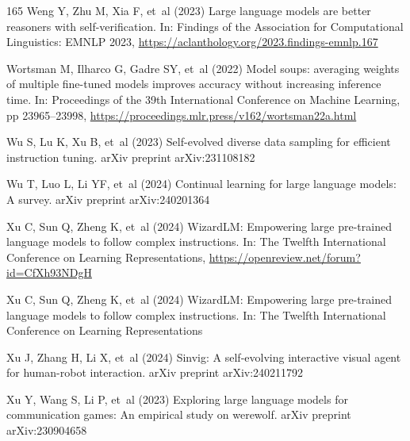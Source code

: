 \documentclass[sn-basic, Numbered]{sn-jnl}%
\theoremstyle{thmstyleone}%
\theoremstyle{thmstyletwo}%
\theoremstyle{thmstylethree}%
\begin{document}
\begin{thebibliography}{165}
Weng Y, Zhu M, Xia F, et~al (2023) Large language models are better reasoners with self-verification. In: Findings of the Association for Computational Linguistics: EMNLP 2023, \urlprefix\url{https://aclanthology.org/2023.findings-emnlp.167}

Wortsman M, Ilharco G, Gadre SY, et~al (2022) Model soups: averaging weights of multiple fine-tuned models improves accuracy without increasing inference time. In: Proceedings of the 39th International Conference on Machine Learning, pp 23965--23998, \urlprefix\url{https://proceedings.mlr.press/v162/wortsman22a.html}

Wu S, Lu K, Xu B, et~al (2023) Self-evolved diverse data sampling for efficient instruction tuning. arXiv preprint arXiv:231108182

Wu T, Luo L, Li YF, et~al (2024) Continual learning for large language models: A survey. arXiv preprint arXiv:240201364

Xu C, Sun Q, Zheng K, et~al (2024{}) Wizard{LM}: Empowering large pre-trained language models to follow complex instructions. In: The Twelfth International Conference on Learning Representations, \urlprefix\url{https://openreview.net/forum?id=CfXh93NDgH}

Xu C, Sun Q, Zheng K, et~al (2024{}) Wizard{LM}: Empowering large pre-trained language models to follow complex instructions. In: The Twelfth International Conference on Learning Representations

Xu J, Zhang H, Li X, et~al (2024{}) Sinvig: A self-evolving interactive visual agent for human-robot interaction. arXiv preprint arXiv:240211792

Xu Y, Wang S, Li P, et~al (2023) Exploring large language models for communication games: An empirical study on werewolf. arXiv preprint arXiv:230904658


\end{thebibliography}
\end{document}
